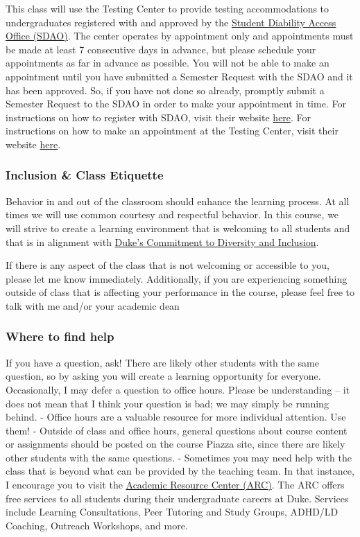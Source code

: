 \documentclass[
]{article}
\begin{document}
This class will use the Testing Center to provide testing accommodations
to undergraduates registered with and approved by the
\href{https://access.duke.edu/students}{Student Diability Access Office
(SDAO)}. The center operates by appointment only and appointments must
be made at least 7 consecutive days in advance, but please schedule your
appointments as far in advance as possible. You will not be able to make
an appointment until you have submitted a Semester Request with the SDAO
and it has been approved. So, if you have not done so already, promptly
submit a Semester Request to the SDAO in order to make your appointment
in time. For instructions on how to register with SDAO, visit their
website \href{https://access.duke.edu/requests}{here}. For instructions
on how to make an appointment at the Testing Center, visit their website
\href{https://testingcenter.duke.edu}{here}.

\hypertarget{inclusion-class-etiquette}{%
\subsubsection{Inclusion \& Class
Etiquette}\label{inclusion-class-etiquette}}

Behavior in and out of the classroom should enhance the learning
process. At all times we will use common courtesy and respectful
behavior. In this course, we will strive to create a learning
environment that is welcoming to all students and that is in alignment
with
\href{https://provost.duke.edu/initiatives/commitment-to-diversity-and-inclusion}{Duke's
Commitment to Diversity and Inclusion}.

If there is any aspect of the class that is not welcoming or accessible
to you, please let me know immediately. Additionally, if you are
experiencing something outside of class that is affecting your
performance in the course, please feel free to talk with me and/or your
academic dean

\hypertarget{where-to-find-help}{%
\subsubsection{Where to find help}\label{where-to-find-help}}

If you have a question, ask! There are likely other students with the
same question, so by asking you will create a learning opportunity for
everyone. Occasionally, I may defer a question to office hours. Please
be understanding -- it does not mean that I think your question is bad;
we may simply be running behind. - Office hours are a valuable resource
for more individual attention. Use them! - Outside of class and office
hours, general questions about course content or assignments should be
posted on the course Piazza site, since there are likely other students
with the same questions. - Sometimes you may need help with the class
that is beyond what can be provided by the teaching team. In that
instance, I encourage you to visit the
\href{https://arc.duke.edu/}{Academic Resource Center (ARC)}. The ARC
offers free services to all students during their undergraduate careers
at Duke. Services include Learning Consultations, Peer Tutoring and
Study Groups, ADHD/LD Coaching, Outreach Workshops, and more.
\end{document}
